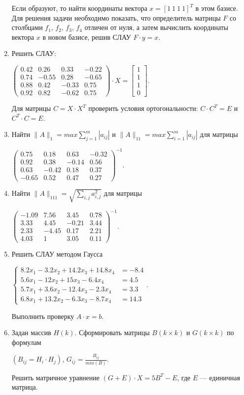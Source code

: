 \begin{enumerate}
Если образуют, то найти координаты вектора  $x=[1\ 1\ 1\ 1]^T$  в этом базисе. Для решения задачи необходимо показать,
что определитель матрицы $F$ со столбцами  $f_1$, $f_2$, $f_3$, $f_4$ 
отличен от нуля, а затем вычислить координаты вектора $x$ в новом базисе, решив СЛАУ  $F\cdot y=x$. 
\item  Решить СЛАУ:

$\left(\begin{matrix}
0.42&0.26&0.33&-0.22\\
0.74&-0.55&0.28&-0.65\\
0.88&0.42&-0.33&0.75\\
0.92&0.82&-0.62&0.75
\end{matrix}\right)\cdot
X=\left[\begin{matrix}1\\1\\1\\0\end{matrix}\right]$. 

Для матрицы  $C=X\cdot X^T$  проверить условия ортогональности:  $C\cdot C^T=E$  и  $C^T\cdot C=E$.
\item Найти  $\|A\|_1=max\sum\limits_{j=1}^m|a_{ij}|$  и 
$\|A\|_{11}=max\sum\limits_{i=1}^m|a_{ij}|$  для матрицы
 
$\left(\begin{matrix}
0.75&0.18&0.63&-0.32\\
0.92&0.38&-0.14&0.56\\
0.63&-0.42&0.18&0.37\\
-0.65&0.52&0.47&0.27
\end{matrix}\right)^{-1}$.

\item Найти  $\|A\|_{111}=\sqrt{\sum\limits_{i,j}a_{i,j}^2}$  для матрицы 

$\left(\begin{matrix}
-1.09&7.56&3.45&0.78\\
3.33&4.45&-0.21&3.44\\
2.33&-4.45&0.17&2.21\\
4.03&1&3.05&0.11
\end{matrix}\right)^{-1}$.
\item  Решить СЛАУ методом Гаусса
 
$\left\{\begin{matrix}
8.2x_1-3.2x_2+14.2x_3+14.8x_4&=-8.4\\
5.6x_1-12x_2+15x_3-6.4x_4&=4.5\\
5.7x_1+3.6x_2-12.4x_3-2.3x_4&=3.3\\
6.8x_1+13.2x_2-6.3x_3-8.7x_4&=14.3
\end{matrix}\right.$. 

Выполнить проверку  $A\cdot x=b$.
\item Задан массив $H(k)$. Сформировать матрицы $B(k\times k)$ и
$G(k\times k)$ по формулам

 $(B_{ij}=H_i\cdot H_j)$,  $G_{ij}=\displaystyle\frac{B_{ij}}{min(B)}$. 

Решить матричное
уравнение  $(G+E)\cdot X=5B^T-E$, где $E$ --- единичная матрица.
\end{enumerate}

